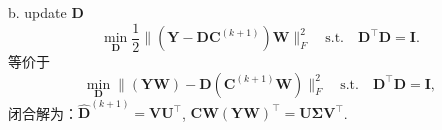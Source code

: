 \documentclass[10pt,twocolumn,letterpaper]{article}
\begin{document}
b. update $\mathbf{D}$
\begin{equation}
\min_{\mathbf{D}}\frac{1}{2}\|(\mathbf{Y}-\mathbf{D}\mathbf{C}^{(k+1)})\mathbf{W}\|_{F}^{2}
\quad
\text{s.t.}
\quad
\mathbf{D}^{\top}\mathbf{D} =\mathbf{I}. 
\end{equation}
等价于
\begin{equation}
\min_{\mathbf{D}}\|(\mathbf{Y}\mathbf{W})-\mathbf{D}(\mathbf{C}^{(k+1)}\mathbf{W})\|_{F}^{2}
\quad
\text{s.t.}
\quad
\mathbf{D}^{\top}\mathbf{D} = \mathbf{I},
\end{equation}
闭合解为：$\hat{\mathbf{D}}^{(k+1)}=\mathbf{V}\mathbf{U}^{\top}$, $\mathbf{C}\mathbf{W}(\mathbf{Y}\mathbf{W})^{\top}=\mathbf{U}\mathbf{\Sigma}\mathbf{V}^{\top}$.

\clearpage
{
\small


}
\end{document}
